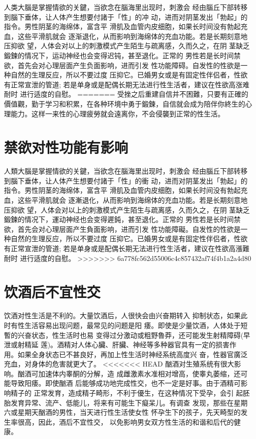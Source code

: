 \documentclass[12pt,UTF8]{ctexbook}
\begin{document}
人类大腦是掌握情欲的关鍵，当欲念在腦海里出现时，刺激会
经由腦丘下部转移到腦下垂体，让人体产生想要付諸于「性」的冲
动，进而对阴茎发出「勃起」的指令。男性阴茎的海绵体，富含平
滑肌及血管内皮细胞，如果长时间没有勃起充血，这些平滑肌就会
逐渐退化，从而影响到海绵体的充血功能。若是长期刻意地压抑欲
望，人体会对以上的刺激模式产生陌生与疏离感，久而久之，在阴
茎缺乏鍛鍊的情况下，运动神经也会变得迟钝，甚至退化。正常的
男性若是长时间禁欲，首先会对心理层面产生负面影响，进而引发
性功能障碍。自发性的性欲是一种自然的生理反应，所以不要过度
压抑它。已婚男女或是有固定性伴侣者，性欲有正常宣泄的管道;
若是单身或是配偶长期无法进行性生活者，建议在性欲高涨难耐时
进行适度的自慰。
=======
受挫之后重建自信并不困難，只要有正確的價值觀，勤于学习和积累，在各种环境中勇于鍛鍊，自信就会成为陪伴你終生的心理能力。这样一来性的心理疲勞就会遠离你，不会侵襲到正常的性生活。

\section{禁欲对性功能有影响}

人類大腦是掌握情欲的关鍵，当欲念在腦海里出现时，刺激会
经由腦丘下部转移到腦下垂体，让人体产生想要付諸于「性」的衝
动，进而对阴茎发出「勃起」的指令。男性阴茎的海绵体，富含平
滑肌及血管内皮细胞，如果长时间没有勃起充血，这些平滑肌就会
逐漸退化，从而影响到海绵体的充血功能。若是长期刻意地压抑欲
望，人体会对以上的刺激模式产生陌生与疏离感，久而久之，在阴
茎缺乏鍛鍊的情况下，運动神经也会变得遲鈍，甚至退化。正常的
男性若是长时间禁欲，首先会对心理层面产生負面影响，进而引发
性功能障礙。自发性的性欲是一种自然的生理反应，所以不要过度
压抑它。已婚男女或是有固定性伴侣者，性欲有正常宣泄的管道;
若是单身或是配偶长期无法进行性生活者，建议在性欲高漲難耐时
进行适度的自慰。
>>>>>>> 6a778fc562d55006c4c857432af74f4b1a2a4d80

\section{饮酒后不宜性交}

饮酒对性生活是不利的。大量饮酒后，人很快会由兴奋期转入
抑制状态，如果此时有性生活容易出现问题，最常见的问题是阳
痿。即使是少量饮酒，人体处于短暫的兴奋状态，性生活时也易
变得过分激动或粗野魯莽，还可能发生射精障碍(早泄或射精延
莲)。酒精对人体心臟、肝臟、神经等多种器官具有一定的损害作
用。如果全身状态已不甚良好，再加上性生活时神经系统高度兴
奋，性器官廣泛充血，对身体的危害就更大了。
<<<<<<< HEAD
酗酒对生殖系统有很大影响。酗酒可加速体内睾酮的分解，造
成雌激素水准相对增高，使睾丸萎缩，还可能导致阳痿。即使酗酒
后能够成功地完成性交，也不一定是好事。由于酒精可影响精子的
正常发育，造成精子畸形，不利于優生，在这种情况下受孕，会引
起胚胎发育异常、流产、低能儿，将来有可能生下癡呆儿。有调查
发现，那些在星期六或星期天酗酒的男性，当天进行性生活使女性
怀孕生下的孩子，先天畸型的发生率很高，因此，酒后不宜性交，
以免影响男女双方性生活的和谐和后代的健康。
\end{document}
